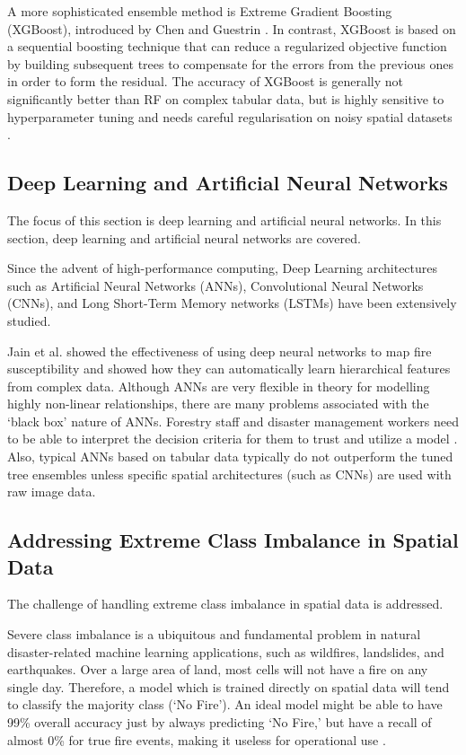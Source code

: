 \documentclass[journal, 10pt, twocolumn]{IEEEtran}
\begin{document}
A more sophisticated ensemble method is Extreme Gradient Boosting (XGBoost), introduced by Chen and Guestrin \cite{b29}. In contrast, XGBoost is based on a sequential boosting technique that can reduce a regularized objective function by building subsequent trees to compensate for the errors from the previous ones in order to form the residual. The accuracy of XGBoost is generally not significantly better than RF on complex tabular data, but is highly sensitive to hyperparameter tuning and needs careful regularisation on noisy spatial datasets \cite{b30}.

\subsection{Deep Learning and Artificial Neural Networks}
The focus of this section is deep learning and artificial neural networks. In this section, deep learning and artificial neural networks are covered.

Since the advent of high-performance computing, Deep Learning architectures such as Artificial Neural Networks (ANNs), Convolutional Neural Networks (CNNs), and Long Short-Term Memory networks (LSTMs) have been extensively studied.

Jain et al. \cite{b31} showed the effectiveness of using deep neural networks to map fire susceptibility and showed how they can automatically learn hierarchical features from complex data. Although ANNs are very flexible in theory for modelling highly non-linear relationships, there are many problems associated with the `black box' nature of ANNs. Forestry staff and disaster management workers need to be able to interpret the decision criteria for them to trust and utilize a model \cite{b32}. Also, typical ANNs based on tabular data typically do not outperform the tuned tree ensembles unless specific spatial architectures (such as CNNs) are used with raw image data.

\subsection{Addressing Extreme Class Imbalance in Spatial Data}
The challenge of handling extreme class imbalance in spatial data is addressed.

Severe class imbalance is a ubiquitous and fundamental problem in natural disaster-related machine learning applications, such as wildfires, landslides, and earthquakes. Over a large area of land, most cells will not have a fire on any single day. Therefore, a model which is trained directly on spatial data will tend to classify the majority class (`No Fire'). An ideal model might be able to have 99\% overall accuracy just by always predicting `No Fire,' but have a recall of almost 0\% for true fire events, making it useless for operational use \cite{b33}.
\end{document}
